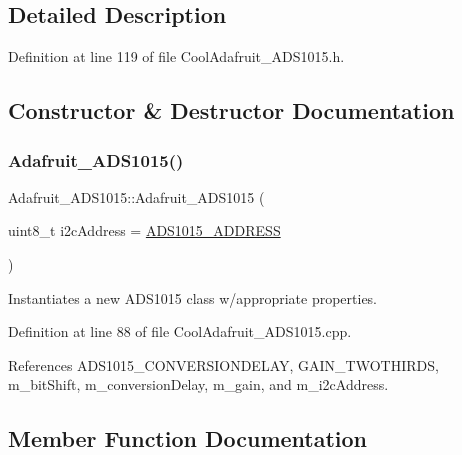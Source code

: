 \subsection{Detailed Description}


Definition at line 119 of file Cool\+Adafruit\+\_\+\+A\+D\+S1015.\+h.



\subsection{Constructor \& Destructor Documentation}
\mbox{\label{class_adafruit___a_d_s1015_a12dfb7b48af1a8e411c59f775c6457ab}} 
\subsubsection{\texorpdfstring{Adafruit\+\_\+\+A\+D\+S1015()}{Adafruit\_ADS1015()}}
{\footnotesize\ttfamily Adafruit\+\_\+\+A\+D\+S1015\+::\+Adafruit\+\_\+\+A\+D\+S1015 (\begin{DoxyParamCaption}\item[{uint8\+\_\+t}]{i2c\+Address = {\ttfamily \hyperlink{_cool_adafruit___a_d_s1015_8h_ae55d158023984e8f0ddc80b58d5b30dc}{A\+D\+S1015\+\_\+\+A\+D\+D\+R\+E\+SS}} }\end{DoxyParamCaption})}



Instantiates a new A\+D\+S1015 class w/appropriate properties. 



Definition at line 88 of file Cool\+Adafruit\+\_\+\+A\+D\+S1015.\+cpp.



References A\+D\+S1015\+\_\+\+C\+O\+N\+V\+E\+R\+S\+I\+O\+N\+D\+E\+L\+AY, G\+A\+I\+N\+\_\+\+T\+W\+O\+T\+H\+I\+R\+DS, m\+\_\+bit\+Shift, m\+\_\+conversion\+Delay, m\+\_\+gain, and m\+\_\+i2c\+Address.



\subsection{Member Function Documentation}
\mbox{\label{class_adafruit___a_d_s1015_a6eba7c3cd854927f60883bb371e5faa6}} 
